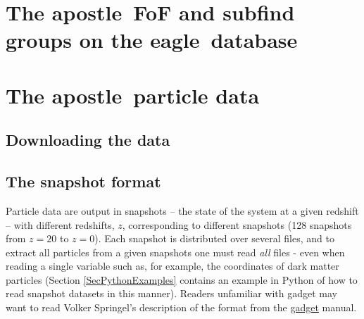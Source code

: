 \documentclass[10pt, a4paper]{article}
\newcommand{\eagle}{{\sc eagle}}
\newcommand{\apostle}{{\sc apostle}}
\newcommand{\hdf}{{\sc hdf5}}
\begin{document}
\begin{table}
\caption{The positions of main haloes at $z=0$ and parameters of the high-resolution Lagrangian regions of the \apostle\ volumes in the initial conditions. The first column labels each volume. The next columns list the ({\small X,Y,Z}) coordinates of each of the primaries at $z=0$, followed by positions of the centers and the radii of the Lagrangian spheres. The phase descriptor for the {\small APOSTLE} runs is, in {\small PANPHASIA} format, {[Panph1,L16,(31250,23438,39063),S12,CH1292987594,DOVE]}. Reproduced from \cite{2016MNRAS.457..844F}.}
\vspace{5pt}
\centering

\label{TabIC}
\end{table}


\section{The \apostle\ FoF and subfind groups on the \eagle\ database}

\section{The \apostle\ particle data}
\label{SecEaglePData}

\subsection{Downloading the data}

\subsection{The snapshot format}

\begin{table}
\label{TabFileLayout}
\caption{\hdf\ groups in snapshot files}
\centering
\renewcommand{\arraystretch}{1.5}
\footnotesize
\vspace{5pt}

\label{TabGroups}
\end{table}

Particle data are output in snapshots -- the state of the system at a given redshift -- with different redshifts, $z$, corresponding to different snapshots (128 snapshots from $z=20$ to $z=0$). Each snapshot is distributed over several files, and to extract all particles from a given snapshots one must read {\em all} files - even when reading a single variable such as, for example, the coordinates of dark matter particles (Section \ref{SecPythonExamples} contains an example in {\sc Python} of how to read snapshot datasets in this manner). Readers unfamiliar with {\sc gadget} may want to read Volker Springel's description of the format from the {\color{blue}\href{https://wwwmpa.mpa-garching.mpg.de/gadget/users-guide.pdf}{\sc gadget} manual}.
\end{document}
